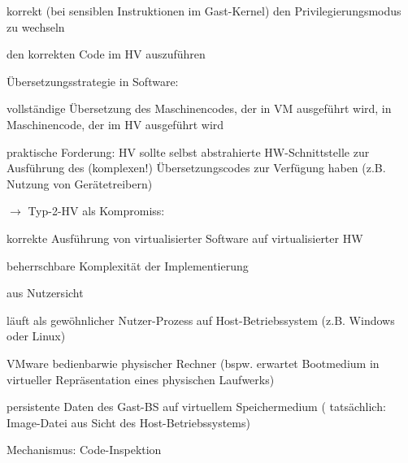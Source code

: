 \documentclass[a4paper]{article}
\begin{document}
\begin{multicols}{3}
\begin{itemize*}
\begin{enumerate*}
            \item korrekt (bei sensiblen Instruktionen im Gast-Kernel) den Privilegierungsmodus zu wechseln
            \item den korrekten Code im HV auszuführen
        \end{enumerate*}
    \end{itemize*}

    Übersetzungsstrategie in Software:

    \begin{itemize*}
        \item vollständige Übersetzung des Maschinencodes, der in VM ausgeführt
        wird, in Maschinencode, der im HV ausgeführt wird
        \item praktische Forderung: HV sollte selbst abstrahierte HW-Schnittstelle
        zur Ausführung des (komplexen!) Übersetzungscodes zur Verfügung haben
        (z.B. Nutzung von Gerätetreibern)
        \item $\rightarrow$ Typ-2-HV als Kompromiss:
        \begin{itemize*}
            \item korrekte Ausführung von virtualisierter Software auf virtualisierter HW
            \item beherrschbare Komplexität der Implementierung
        \end{itemize*}
    \end{itemize*}

    aus Nutzersicht

    \begin{itemize*}
        \item läuft als gewöhnlicher Nutzer-Prozess auf Host-Betriebssystem (z.B.
        Windows oder Linux)
        \item VMware bedienbarwie physischer Rechner (bspw. erwartet Bootmedium in
        virtueller Repräsentation eines physischen Laufwerks)
        \item persistente Daten des Gast-BS auf virtuellem Speichermedium (
        tatsächlich: Image-Datei aus Sicht des Host-Betriebssystems)
    \end{itemize*}

    Mechanismus: Code-Inspektion


\end{multicols}
\end{document}
